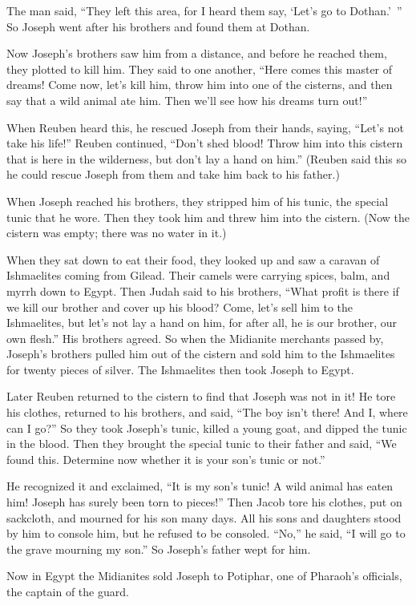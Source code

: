 {The man
said,
“They left
this
area, for
I heard
them say, ‘Let’s
go
to Dothan.’ ”
So Joseph
went after
his brothers
and found
them at Dothan.
\par }{\PP {}Now Joseph’s brothers saw
him from a distance,
and before
he reached
them, they plotted
to kill him.
They said
to
one
another,
“Here
comes
this master
of dreams!
Come now,
let’s
kill
him, throw
him into one
of the cisterns,
and then say
that a wild animal
ate
him. Then we’ll see
how
his dreams turn out!”
\par }{\PP {}When Reuben
heard
this, he rescued
Joseph from their hands,
saying, “Let’s
not
take his life!”
Reuben
continued, “Don’t
shed
blood! Throw
him into
this cistern
that is here
in the wilderness,
but don’t
lay
a hand
on him.”
(Reuben said
this so
he could rescue
Joseph from them and take him back
to
his father.)
\par }{\PP {}When
Joseph
reached
his brothers,
they stripped
him of his
tunic,
the special
tunic
that
he wore.
Then they took
him and threw
him into the cistern.
(Now the cistern
was empty;
there was no
water in it.)
\par }{\PP {}When they sat
down to eat
their food,
they looked
up and saw
a caravan
of Ishmaelites
coming
from Gilead.
Their camels
were carrying
spices,
balm,
and myrrh
down
to Egypt.
Then Judah
said to
his brothers,
“What
profit
is there if
we kill
our brother
and cover
up his blood?
Come, let’s
sell
him to the Ishmaelites,
but let’s not
lay a hand
on him, for
after all, he is our brother,
our own flesh.”
His brothers
agreed.
So when the Midianite
merchants
passed by,
Joseph’s
brothers pulled
him out
of the cistern
and sold
him to the Ishmaelites
for twenty
pieces of silver.
The Ishmaelites then took
Joseph
to Egypt.
\par }{\PP {}Later Reuben
returned
to
the cistern
to find that Joseph
was not
in it! He tore
his clothes,
returned
to
his brothers,
and said,
“The boy
isn’t there! And I,
where
can I
go?”
So they took
Joseph’s
tunic,
killed
a young
goat,
and dipped
the tunic
in the blood.
Then they brought
the special
tunic
to
their father
and said,
“We found
this.
Determine
now
whether
it is
your son’s
tunic
or
not.”
\par }{\PP {}He recognized
it and exclaimed,
“It is my son’s
tunic! A wild animal
has eaten
him! Joseph
has surely been torn
to pieces!”
Then Jacob
tore
his clothes,
put on
sackcloth,
and mourned
for
his son
many
days.
All
his sons
and daughters
stood by him to
console
him, but he refused
to
be consoled.
“No,” he said,
“I will go
to the grave
mourning
my son.”
So Joseph’s
father
wept for him.
\par }{\PP {}Now in Egypt
the Midianites
sold
Joseph to
Potiphar,
one of Pharaoh’s
officials,
the captain
of the guard.

}
